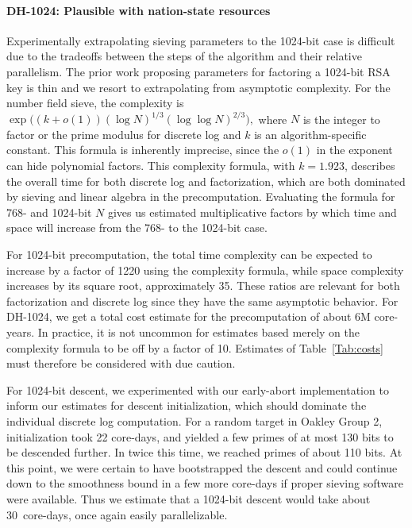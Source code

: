 \paragraph{DH-1024: Plausible with nation-state resources}
Experimentally extrapolating sieving parameters to the 1024-bit case
is difficult due to the tradeoffs between the steps of the algorithm and their relative
parallelism.  The prior work proposing parameters for factoring a
1024-bit RSA key is thin and we resort to extrapolating from asymptotic complexity.  For the
number field sieve, the complexity is $\exp\big((k+o(1))(\log N)^{1/3}(\log\log N)^{2/3}\big),$
where $N$ is the integer to factor or the prime modulus for discrete log and $k$ is an
algorithm-specific constant. This formula is
inherently imprecise, since the $o(1)$ in the exponent can hide
polynomial factors.
This
complexity formula, with $k=1.923$, describes the overall time for both
discrete log and factorization, which are both dominated by sieving and linear algebra in the precomputation. Evaluating the formula for 768- and 1024-bit $N$ gives us estimated
multiplicative factors by which time and space will increase from
the 768- to the 1024-bit case.

For 1024-bit precomputation, the total time complexity can be expected to
increase by a factor of
1220 using the complexity formula, while space
complexity increases by its square root, approximately
35.
These ratios are relevant for both factorization and discrete log
since they have the same asymptotic behavior. For DH-1024,
we get a total cost estimate for the precomputation of about 6M core-years.
In practice, it is not uncommon for estimates based merely on the
complexity formula to
be off by a factor of 10. Estimates of Table~\ref{Tab:costs} must therefore be considered with
due caution.

For 1024-bit descent, we experimented with our early-abort
implementation to inform our estimates for descent
initialization, which should dominate the individual discrete log computation.  For a random target in Oakley Group 2, initialization took 22 core-days, and yielded a few primes of at most
130 bits to be descended further. In twice this time, we
reached primes of about 110 bits.  At this point, we were certain to have bootstrapped the descent and
could continue down to the smoothness bound in a few more core-days
if proper sieving software were available.  Thus we estimate that a 1024-bit
descent would take about 30~core-days, once again easily parallelizable.

